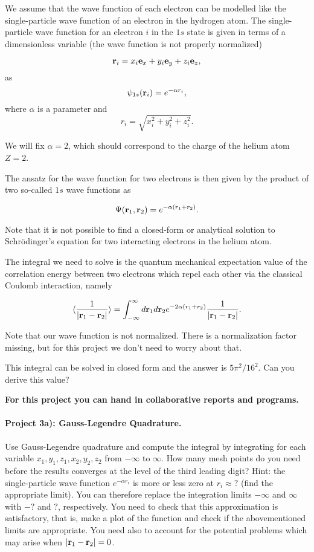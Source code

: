 \documentclass[%
oneside,                 %
final,                   %
10pt]{article}
\begin{document}
We assume that the wave function of each electron can be modelled like
the single-particle wave function of an electron in the hydrogen
atom. The single-particle wave function for an electron $i$ in the
$1s$ state is given in terms of a dimensionless variable (the wave
function is not properly normalized)

\[
   {\bf r}_i =  x_i {\bf e}_x + y_i {\bf e}_y +z_i {\bf e}_z ,
\]
as
\[
   \psi_{1s}({\bf r}_i)  =   e^{-\alpha r_i},
\]
where $\alpha$ is a parameter and 
\[
r_i = \sqrt{x_i^2+y_i^2+z_i^2}.
\]

We will fix $\alpha=2$, which should correspond to the charge of the helium atom $Z=2$. 

The ansatz for the wave function for two electrons is then given by the product of two 
so-called 
$1s$ wave functions as 

\[
   \Psi({\bf r}_1,{\bf r}_2)  =   e^{-\alpha (r_1+r_2)}.
\]

Note that it is not possible to find a closed-form or analytical
solution to Schr\"odinger's equation for two interacting electrons in
the helium atom.

The integral we need to solve is the quantum mechanical expectation
value of the correlation energy between two electrons which repel each
other via the classical Coulomb interaction, namely

\begin{equation}\label{eq:correlationenergy}
   \langle \frac{1}{|{\bf r}_1-{\bf r}_2|} \rangle =
   \int_{-\infty}^{\infty} d{\bf r}_1d{\bf r}_2  e^{-2\alpha (r_1+r_2)}\frac{1}{|{\bf r}_1-{\bf r}_2|}.
\end{equation}

Note that our wave function is not normalized. There is a
normalization factor missing, but for this project we don't need to
worry about that.

This integral can be solved in closed form and the answer is
$5\pi^2/16^2$. Can you derive this value?

\textbf{For this project you can hand in collaborative reports and programs.}

\paragraph{Project  3a): Gauss-Legendre Quadrature.}
Use Gauss-Legendre quadrature and compute the integral by integrating
for each variable $x_1,y_1,z_1,x_2,y_2,z_2$ from $-\infty$ to
$\infty$.  How many mesh points do you need before the results
converges at the level of the third leading digit?  Hint: the
single-particle wave function $e^{-\alpha r_i}$ is more or less zero
at $r_i \approx ?$ (find the appropriate limit).  You can therefore
replace the integration limits $-\infty$ and $\infty$ with $-?$ and
$?$, respectively.  You need to check that this approximation is
satisfactory, that is, make a plot of the function and check if the
abovementioned limits are appropriate.  You need also to account for
the potential problems which may arise when $|{\bf r}_1-{\bf r}_2|=0$.
\end{document}
